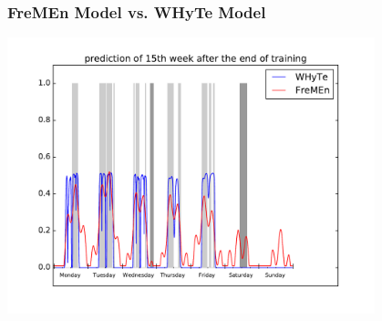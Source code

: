 
\begin{frame}
	\frametitle{FreMEn Model vs. WHyTe Model}
    \vspace{3mm}
            \includegraphics[width=0.8\textwidth]{fig/FreMEn_WHyTe.pdf}
\end{frame}




